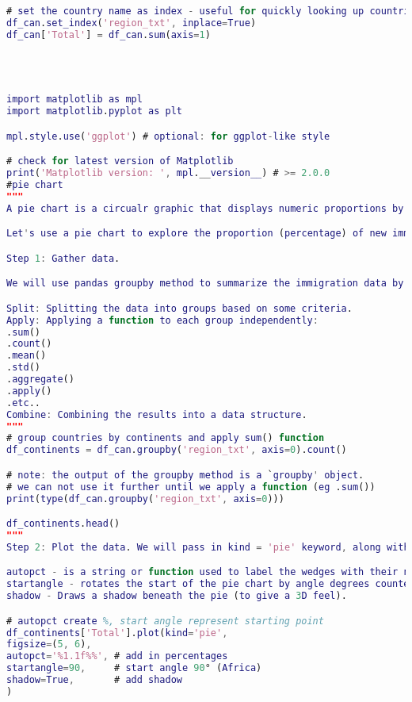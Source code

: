 \documentclass{cumcmthesis}
\begin{document}
\begin{lstlisting}[language=matlab]
# set the country name as index - useful for quickly looking up countries using .loc method
df_can.set_index('region_txt', inplace=True)
df_can['Total'] = df_can.sum(axis=1)




import matplotlib as mpl
import matplotlib.pyplot as plt

mpl.style.use('ggplot') # optional: for ggplot-like style

# check for latest version of Matplotlib
print('Matplotlib version: ', mpl.__version__) # >= 2.0.0
#pie chart
"""
A pie chart is a circualr graphic that displays numeric proportions by dividing a circle (or pie) into proportional slices. You are most likely already familiar with pie charts as it is widely used in business and media. We can create pie charts in Matplotlib by passing in the kind=pie keyword.

Let's use a pie chart to explore the proportion (percentage) of new immigrants grouped by continents for the entire time period from 1980 to 2013.

Step 1: Gather data.

We will use pandas groupby method to summarize the immigration data by Continent. The general process of groupby involves the following steps:

Split: Splitting the data into groups based on some criteria.
Apply: Applying a function to each group independently:
.sum()
.count()
.mean() 
.std() 
.aggregate()
.apply()
.etc..
Combine: Combining the results into a data structure.
"""
# group countries by continents and apply sum() function
df_continents = df_can.groupby('region_txt', axis=0).count()

# note: the output of the groupby method is a `groupby' object.
# we can not use it further until we apply a function (eg .sum())
print(type(df_can.groupby('region_txt', axis=0)))

df_continents.head()
"""
Step 2: Plot the data. We will pass in kind = 'pie' keyword, along with the following additional parameters:

autopct - is a string or function used to label the wedges with their numeric value. The label will be placed inside the wedge. If it is a format string, the label will be fmt%pct.
startangle - rotates the start of the pie chart by angle degrees counterclockwise from the x-axis.
shadow - Draws a shadow beneath the pie (to give a 3D feel).

# autopct create %, start angle represent starting point
df_continents['Total'].plot(kind='pie',
figsize=(5, 6),
autopct='%1.1f%%', # add in percentages
startangle=90,     # start angle 90° (Africa)
shadow=True,       # add shadow
)


\end{lstlisting}
\end{document}
